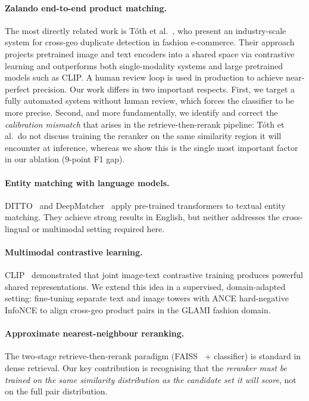\documentclass[10pt,twocolumn]{article}
\begin{document}
\paragraph{Zalando end-to-end product matching.}
The most directly related work is Tóth et al.~\cite{zalando}, who present an
industry-scale system for cross-geo duplicate detection in fashion e-commerce.
Their approach projects pretrained image and text encoders into a shared space
via contrastive learning and outperforms both single-modality systems and
large pretrained models such as CLIP. A human review loop is used in production
to achieve near-perfect precision.
Our work differs in two important respects.
First, we target a fully automated system without human review, which forces
the classifier to be more precise.
Second, and more fundamentally, we identify and correct the \emph{calibration
mismatch} that arises in the retrieve-then-rerank pipeline: Tóth et al.\ do
not discuss training the reranker on the same similarity region it will
encounter at inference, whereas we show this is the single most important
factor in our ablation (9-point F1 gap).

\paragraph{Entity matching with language models.}
DITTO~\cite{ditto} and DeepMatcher~\cite{deepmatcher} apply pre-trained
transformers to textual entity matching. They achieve strong results in
English, but neither addresses the cross-lingual or multimodal setting
required here.

\paragraph{Multimodal contrastive learning.}
CLIP~\cite{clip} demonstrated that joint image-text contrastive training
produces powerful shared representations. We extend this idea in a
supervised, domain-adapted setting: fine-tuning separate text and image towers
with ANCE hard-negative InfoNCE to align cross-geo product pairs in the GLAMI
fashion domain.

\paragraph{Approximate nearest-neighbour reranking.}
The two-stage retrieve-then-rerank paradigm (FAISS~\cite{faiss} +
classifier) is standard in dense retrieval. Our key contribution is
recognising that the \emph{reranker must be trained on the same similarity
distribution as the candidate set it will score}, not on the full pair
distribution.
\end{document}
